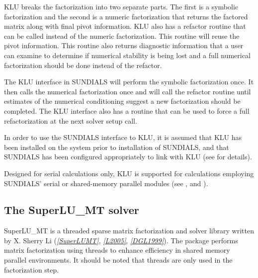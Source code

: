 \documentclass[letterpaper,10pt,english]{sphinxmanual}
\begin{document}
KLU breaks the factorization into two separate parts.  The first is a
symbolic factorization and the second is a numeric factorization that
returns the factored matrix along with final pivot information.  KLU
also has a refactor routine that can be called instead of the numeric
factorization.  This routine will reuse the pivot information.  This
routine also returns diagnostic information that a user can examine to
determine if numerical stability is being lost and a full numerical
factorization should be done instead of the refactor.

The KLU interface in SUNDIALS will perform the symbolic factorization
once.  It then calls the numerical factorization once and will call
the refactor routine until estimates of the numerical conditioning
suggest a new factorization should be completed.  The KLU interface
also has a  routine that can be used to force a full
refactorization at the next solver setup call.

In order to use the SUNDIALS interface to KLU, it is
assumed that KLU has been installed on the system prior to
installation of SUNDIALS, and that SUNDIALS has been configured
appropriately to link with KLU (see {\hyperref[Install:installation]{\emph{}}} for details).

Designed for serial calculations only, KLU is supported for
calculations employing SUNDIALS' serial or shared-memory parallel
 modules (see {\hyperref[nvectors/NVector_Serial:nvectors-nvserial]{\emph{}}},
{\hyperref[nvectors/NVector_OpenMP:nvectors-openmp]{\emph{}}} and {\hyperref[nvectors/NVector_Pthreads:nvectors-pthreads]{\emph{}}}).


\subsection{The SuperLU\_MT solver}
\label{linear_solvers/SLS:the-superlu-mt-solver}
SuperLU\_MT is a threaded sparse matrix factorization and solver
library written by X. Sherry Li (\label{linear_solvers/SLS:id3}{\hyperref[References:superlumt]{\emph{{[}SuperLUMT{]}}}}, \label{linear_solvers/SLS:id4}{\hyperref[References:l2005]{\emph{{[}L2005{]}}}}, \label{linear_solvers/SLS:id5}{\hyperref[References:dgl1999]{\emph{{[}DGL1999{]}}}}).
The package performs matrix factorization using threads to enhance
efficiency in shared memory parallel environments.  It should be noted
that threads are only used in the factorization step.
\end{document}
